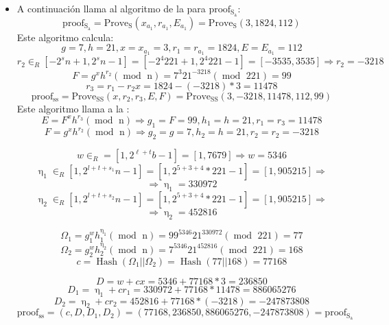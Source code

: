 \begin{itemize}
    \item A continuación llama al algoritmo de la  para $\operatorname{proof_{S_{a}}}$:
    $$\operatorname{proof_{S_{a}}} = \operatorname{Prove_{S}}(x_{a_{1}}, r_{a_{1}}, E_{a_{1}}) = \operatorname{Prove_{S}}(3, 1824, 112)$$
    Este algoritmo calcula:
    $$g = 7, h = 21, x = x_{a_{1}} = 3, r_{1} = r_{a_{1}} = 1824, E = E_{a_{1}} = 112$$
    $$r_{2} \in_{R} [-2^{s}n+1, 2^{s}n-1] = [-2^{4}221+1, 2^{4}221-1] = [-3535, 3535] \Rightarrow r_{2} = -3218$$
    $$F = g^{x}h^{r_{2}} (\operatorname{mod} \text{ n}) = 7^{3}21^{-3218} (\operatorname{mod} \text{ 221}) = 99$$
    $$r_{3} = r_{1} - r_{2}x = 1824 - (-3218 )*3 = 11478$$
    $$\operatorname{proof_{ss}} = \operatorname{Prove_{SS}}(x, r_{2}, r_{3}, E, F) = \operatorname{Prove_{SS}}(3, -3218, 11478, 112, 99)$$
    Este algoritmo llama a la :
    $$E = F^{x}h^{r_{3}} (\operatorname{mod} \text{ n}) \Rightarrow g_{1} = F = 99, h_{1} = h = 21, r_{1} = r_{3} = 11478$$
    $$F = g^{x}h^{r_{2}} (\operatorname{mod} \text{ n}) \Rightarrow g_{2} = g = 7, h_{2} = h = 21, r_{2} = r_{2} = -3218$$
    
    $$w \in_{R} = [1, 2^{\ell+t}b-1] = [1, 7679] \Rightarrow w = 5346$$
    $$\upeta_{1} \in_{R} [1, 2^{l + t + s_{1}}n-1] = [1, 2^{5+3+4}*221-1] = [1, 905215] \Rightarrow$$ $$\Rightarrow \upeta_{1} = 330972$$
    $$\upeta_{2} \in_{R} [1, 2^{l + t + s_{2}}n-1] = [1, 2^{5+3+4}*221-1] = [1, 905215] \Rightarrow$$ $$\Rightarrow \upeta_{2} = 452816$$
    
    $$\Omega_{1} = g_{1}^{w}h_{1}^{\upeta_{1}} (\operatorname{mod} \text{ n}) = 99^{5346}21^{330972} (\operatorname{mod} \text{ 221}) = 77$$
    $$\Omega_{2} = g_{2}^{w}h_{2}^{\upeta_{2}} (\operatorname{mod} \text{ n}) = 7^{5346}21^{452816} (\operatorname{mod} \text{ 221}) = 168$$
    $$c = \operatorname{Hash}(\Omega_{1} || \Omega_{2}) = \operatorname{Hash}(77 || 168) = 77168$$
    
    $$D = w + cx = 5346 + 77168 * 3 = 236850$$
    $$D_{1} = \upeta_{1} + cr_{1} = 330972 + 77168 * 11478 = 886065276$$
    $$D_{2} = \upeta_{2} + cr_{2} = 452816 + 77168 * (-3218) = -247873808$$
    $$\operatorname{proof_{ss}} = (c, D, D_{1}, D_{2}) = (77168, 236850, 886065276, -247873808) = \operatorname{proof_{S_{a}}}$$
    

\end{itemize}
